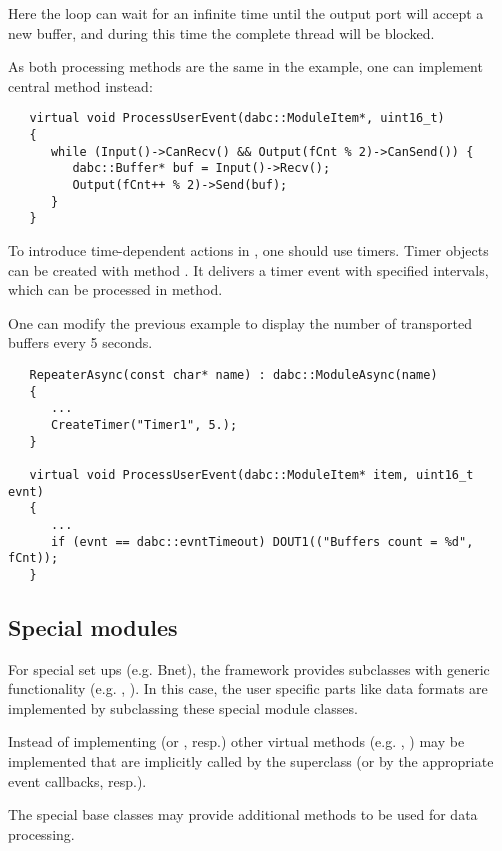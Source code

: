 Here the  loop can wait for an infinite time 
until the output port will accept a new buffer,
and during this time the complete thread will be blocked. 

As both processing methods are the same in the example,  
one can implement central  method instead:  
 
\begin{small}
\begin{verbatim}
   virtual void ProcessUserEvent(dabc::ModuleItem*, uint16_t)
   {
      while (Input()->CanRecv() && Output(fCnt % 2)->CanSend()) {
         dabc::Buffer* buf = Input()->Recv();
         Output(fCnt++ % 2)->Send(buf);
      }
   }
\end{verbatim}
\end{small}

To introduce time-dependent actions in , 
one should use timers. Timer objects can be created with method 
. It delivers a timer event with specified intervals, 
which can be processed in  method.

One can modify the previous example to display the number of transported buffers
every 5 seconds.

\begin{small}
\begin{verbatim}
   RepeaterAsync(const char* name) : dabc::ModuleAsync(name)
   {
      ...
      CreateTimer("Timer1", 5.);
   }

   virtual void ProcessUserEvent(dabc::ModuleItem* item, uint16_t evnt)
   {
      ...
      if (evnt == dabc::evntTimeout) DOUT1(("Buffers count = %d", fCnt));  
   }
\end{verbatim}
\end{small}
   

\subsection{Special modules}
For special set ups (e.g. Bnet), the framework provides 
    subclasses with generic functionality 
   (e.g. , ). 
   In this case, the user specific parts like data formats are 
   implemented by subclassing these special module classes.

   
\begin{compactenum}

\item  Instead of implementing  (or , resp.) 
other virtual methods (e.g. , ) may be 
      implemented that are implicitly called by the superclass  (or
      by the appropriate event callbacks, resp.).
\item  The special base classes may provide additional 
      methods to be used for data processing.    
\end{compactenum}


